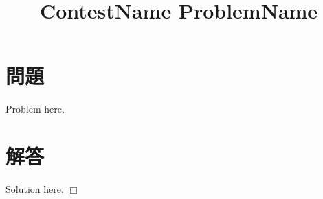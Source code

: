 \documentclass[uplatex,dvipdfmx,a4paper]{jsarticle}
\title{ContestName ProblemName}
\date{}
\author{}
\def\qed{\hfill $\Box$}
\newenvironment{problem}{\section*{問題}}{}
\newenvironment{solution}{\section*{解答}}{\qed}
\begin{document}
\maketitle
\begin{problem}
    Problem here.
\end{problem}

\begin{solution}
    Solution here.
\end{solution}
\end{document}
